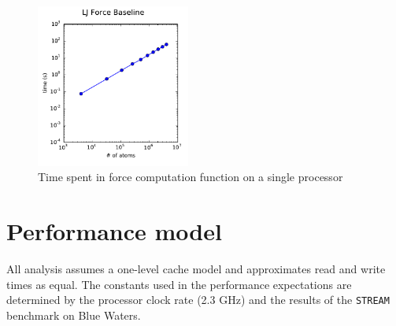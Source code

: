 \documentclass[12pt]{article}
\begin{document}
\begin{figure}[h!]
    \centering
    \includegraphics[width=0.45\textwidth]{../figs/baseline_forceLJ.pdf}
    \caption{Time spent in force computation function on a single processor}
\end{figure}

\section{Performance model}
All analysis assumes a one-level cache model and approximates read and write 
times as equal.  The constants used in the performance expectations are determined 
by the processor clock rate (2.3 GHz) and the results of the \texttt{STREAM} benchmark 
on Blue Waters. \\
\end{document}
